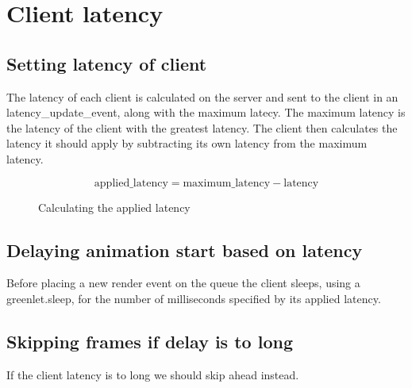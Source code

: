 \section{Client latency}

\subsection{Setting latency of client}
The latency of each client is calculated on the server and sent to the client in an latency\_update\_event, along with the maximum latecy. The maximum latency is the latency of the client with the greatest latency. The client then calculates the latency it should apply by subtracting its own latency from the maximum latency.

\begin{figure}[h!]
	\begin{displaymath}
		\text{applied\_latency} = \text{maximum\_latency} - \text{latency}
	\end{displaymath}
	\caption{Calculating the applied latency}
	\label{fig:applatency}
\end{figure} 

\subsection{Delaying animation start based on latency}
Before placing a new render event on the queue the client sleeps, using a greenlet.sleep, for the number of milliseconds specified by its applied latency.

\subsection{Skipping frames if delay is to long}
If the client latency is to long we should skip ahead instead.
